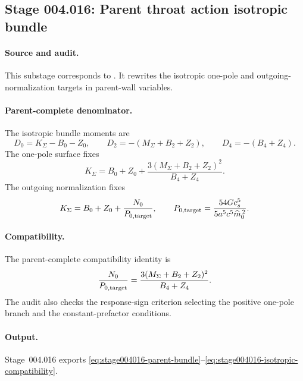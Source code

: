 \subsection*{Stage 004.016: Parent throat action isotropic bundle}
\label{subsec:stage004016-parent-throat-action-isotropic-bundle}

\paragraph{Source and audit.}
This substage corresponds to
.
It rewrites the isotropic one-pole and outgoing-normalization targets in
parent-wall variables.

\paragraph{Parent-complete denominator.}
The isotropic bundle moments are
\begin{equation}
\label{eq:stage004016-parent-bundle}
D_0=K_\Sigma-B_0-Z_0,\qquad
D_2=-(M_\Sigma+B_2+Z_2),\qquad
D_4=-(B_4+Z_4).
\end{equation}
The one-pole surface fixes
\begin{equation}
\label{eq:stage004016-one-pole-parent}
K_\Sigma=B_0+Z_0+
\frac{3(M_\Sigma+B_2+Z_2)^2}{B_4+Z_4}.
\end{equation}
The outgoing normalization fixes
\begin{equation}
\label{eq:stage004016-normalization-parent}
K_\Sigma=B_0+Z_0+\frac{N_0}{P_{0,\rm target}},
\qquad
P_{0,\rm target}=\frac{54Gc_s^5}{5a^5c^5\widehat m_0^{\,2}}.
\end{equation}

\paragraph{Compatibility.}
The parent-complete compatibility identity is
\begin{equation}
\label{eq:stage004016-isotropic-compatibility}
\frac{N_0}{P_{0,\rm target}}
=\frac{3(M_\Sigma+B_2+Z_2)^2}{B_4+Z_4}.
\end{equation}
The audit also checks the response-sign criterion selecting the positive
one-pole branch and the constant-prefactor conditions.

\paragraph{Output.}
Stage~004.016 exports \eqref{eq:stage004016-parent-bundle}--\eqref{eq:stage004016-isotropic-compatibility}.
